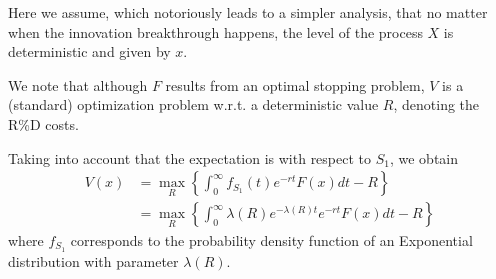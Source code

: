 Here we assume, which notoriously leads to a simpler analysis, that no matter when the innovation breakthrough happens, the level of the process $X$ is deterministic and given by $x$.



We note that although $F$ results from an optimal stopping problem, $V$ is a (standard) optimization problem w.r.t. a deterministic value $R$, denoting the R\%D costs.

Taking into account that the expectation is with respect to $S_1$, we obtain
\begin{align}
 V(x)&=\max_R  \left\{ \int_0 ^\infty f_{S_1}(t) e^{-rt} F(x) dt -R \right\} \nonumber \\
 &=\max_R  \left\{ \int_0 ^\infty \lambda(R) e^{-\lambda(R)t} e^{-rt} F(x) dt -R \right\} \label{max_V2}
\end{align}
where $f_{S_1}$ corresponds to the probability density function of an Exponential distribution with parameter $\lambda(R)$. %

